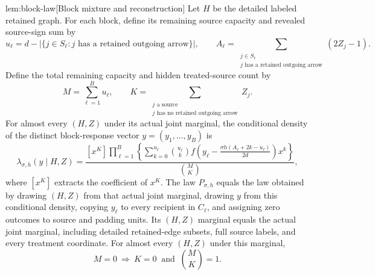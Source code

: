 \documentclass[11pt]{article}
\begin{document}
\begin{lemmav}{lem:block-law}[Block mixture and reconstruction]
Let \(H\) be the detailed labeled retained graph. For each block, define its remaining source capacity and revealed source-sign sum by
\[
u_\ell=d-\bigl|\{j\in S_\ell:j\text{ has a retained outgoing arrow}\}\bigr|,
\qquad
A_\ell=\sum_{\substack{j\in S_\ell\\j\text{ has a retained outgoing arrow}}}(2Z_j-1).
\]
Define the total remaining capacity and hidden treated-source count by
\[
M=\sum_{\ell=1}^B u_\ell,
\qquad
K=\sum_{\substack{j\text{ a source}\\j\text{ has no retained outgoing arrow}}}Z_j.
\]
For almost every \((H,Z)\) under its actual joint marginal, the conditional density of the distinct block-response vector \(y=(y_1,\ldots,y_B)\) is
\[
\lambda_{\sigma,h}(y\mid H,Z)
=
\frac{
[x^K]\displaystyle\prod_{\ell=1}^B
\left\{
\sum_{k=0}^{u_\ell}
\binom{u_\ell}{k}
f\!\left(y_\ell-\frac{\sigma h(A_\ell+2k-u_\ell)}{2d}\right)x^k
\right\}
}{
\binom{M}{K}
},
\]
where \([x^K]\) extracts the coefficient of \(x^K\). The law \(P_{\sigma,h}\) equals the law obtained by drawing \((H,Z)\) from that actual joint marginal, drawing \(y\) from this conditional density, copying \(y_\ell\) to every recipient in \(C_\ell\), and assigning zero outcomes to source and padding units. Its \((H,Z)\) marginal equals the actual joint marginal, including detailed retained-edge subsets, full source labels, and every treatment coordinate. For almost every \((H,Z)\) under this marginal,
\[
M=0\ \Longrightarrow\ K=0\ \text{ and }\ \binom{M}{K}=1.
\]
\end{lemmav}
\end{document}
